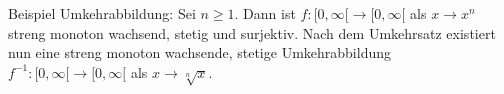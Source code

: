 \begin{example}{Beispiel Umkehrabbildung:}
    Sei $n \geq 1$. Dann ist $f : [0, \infty[\to [0, \infty[$ als $x \to x^n$ streng monoton wachsend, stetig und surjektiv. Nach dem Umkehrsatz existiert nun eine streng monoton wachsende, stetige Umkehrabbildung $f^{-1} : [0, \infty [\to [0, \infty[$ als $x \to \sqrt[n]{x}$.
\end{example}